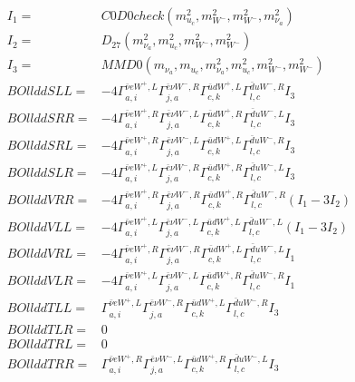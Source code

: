 \documentclass[A4,landscape]{article}
\begin{document}
\begin{align} 
I_1 = & C0D0check(m^2_{u_{{c}}}, m^2_{W^-}, m^2_{W^-}, m^2_{\nu_{{a}}}) \\ 
I_2 = & D_{27}(m^2_{\nu_{{a}}}, m^2_{u_{{c}}}, m^2_{W^-}, m^2_{W^-}) \\ 
I_3 = & MMD0(m_{\nu_{{a}}}, m_{u_{{c}}}, m^2_{\nu_{{a}}}, m^2_{u_{{c}}}, m^2_{W^-}, m^2_{W^-}) \\ 
  BOllddSLL= & -4  \Gamma^{\bar{\nu}e W^+,L}_{a, i} \Gamma^{\bar{e}\nu W^- ,R}_{j, a} \Gamma^{\bar{u}d W^+,L}_{c, k} \Gamma^{\bar{d}u W^- ,R}_{l, c} I_3 \\ 
  BOllddSRR= & -4  \Gamma^{\bar{\nu}e W^+,R}_{a, i} \Gamma^{\bar{e}\nu W^- ,L}_{j, a} \Gamma^{\bar{u}d W^+,R}_{c, k} \Gamma^{\bar{d}u W^- ,L}_{l, c} I_3 \\ 
  BOllddSRL= & -4  \Gamma^{\bar{\nu}e W^+,R}_{a, i} \Gamma^{\bar{e}\nu W^- ,L}_{j, a} \Gamma^{\bar{u}d W^+,L}_{c, k} \Gamma^{\bar{d}u W^- ,R}_{l, c} I_3 \\ 
  BOllddSLR= & -4  \Gamma^{\bar{\nu}e W^+,L}_{a, i} \Gamma^{\bar{e}\nu W^- ,R}_{j, a} \Gamma^{\bar{u}d W^+,R}_{c, k} \Gamma^{\bar{d}u W^- ,L}_{l, c} I_3 \\ 
  BOllddVRR= & -4  \Gamma^{\bar{\nu}e W^+,R}_{a, i} \Gamma^{\bar{e}\nu W^- ,R}_{j, a} \Gamma^{\bar{u}d W^+,R}_{c, k} \Gamma^{\bar{d}u W^- ,R}_{l, c} (I_1 - 3 I_2) \\ 
  BOllddVLL= & -4  \Gamma^{\bar{\nu}e W^+,L}_{a, i} \Gamma^{\bar{e}\nu W^- ,L}_{j, a} \Gamma^{\bar{u}d W^+,L}_{c, k} \Gamma^{\bar{d}u W^- ,L}_{l, c} (I_1 - 3 I_2) \\ 
  BOllddVRL= & -4  \Gamma^{\bar{\nu}e W^+,R}_{a, i} \Gamma^{\bar{e}\nu W^- ,R}_{j, a} \Gamma^{\bar{u}d W^+,L}_{c, k} \Gamma^{\bar{d}u W^- ,L}_{l, c} I_1 \\ 
  BOllddVLR= & -4  \Gamma^{\bar{\nu}e W^+,L}_{a, i} \Gamma^{\bar{e}\nu W^- ,L}_{j, a} \Gamma^{\bar{u}d W^+,R}_{c, k} \Gamma^{\bar{d}u W^- ,R}_{l, c} I_1 \\ 
  BOllddTLL= &  \Gamma^{\bar{\nu}e W^+,L}_{a, i} \Gamma^{\bar{e}\nu W^- ,R}_{j, a} \Gamma^{\bar{u}d W^+,L}_{c, k} \Gamma^{\bar{d}u W^- ,R}_{l, c} I_3 \\ 
  BOllddTLR= & 0 \\ 
  BOllddTRL= & 0 \\ 
  BOllddTRR= &  \Gamma^{\bar{\nu}e W^+,R}_{a, i} \Gamma^{\bar{e}\nu W^- ,L}_{j, a} \Gamma^{\bar{u}d W^+,R}_{c, k} \Gamma^{\bar{d}u W^- ,L}_{l, c} I_3 \\ 
\end{align} 
\end{document}
